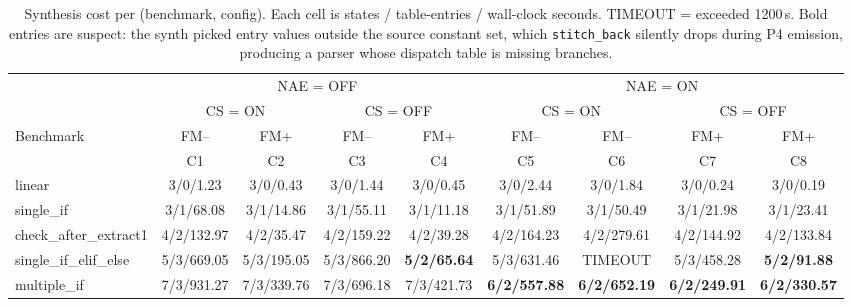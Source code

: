 
\begin{table}[h]
\centering
\small
\setlength{\tabcolsep}{4pt}
\begin{tabular}{l|cccc|cccc}
\toprule
 & \multicolumn{4}{c|}{NAE = OFF} & \multicolumn{4}{c}{NAE = ON} \\
 & \multicolumn{2}{c}{CS = ON} & \multicolumn{2}{c|}{CS = OFF}
 & \multicolumn{2}{c}{CS = ON} & \multicolumn{2}{c}{CS = OFF} \\
Benchmark
 & FM--                & FM+                 & FM--                & FM+
 & FM--                & FM--                & FM+                 & FM+ \\
 & C1                  & C2                  & C3                  & C4
 & C5                  & C6                  & C7                  & C8 \\
\midrule
linear               & 3/0/1.23   & 3/0/0.43   & 3/0/1.44   & 3/0/0.45
                     & 3/0/2.44   & 3/0/1.84   & 3/0/0.24   & 3/0/0.19   \\
single\_if            & 3/1/68.08  & 3/1/14.86  & 3/1/55.11  & 3/1/11.18
                     & 3/1/51.89  & 3/1/50.49  & 3/1/21.98  & 3/1/23.41  \\
check\_after\_extract1 & 4/2/132.97 & 4/2/35.47  & 4/2/159.22 & 4/2/39.28
                     & 4/2/164.23 & 4/2/279.61 & 4/2/144.92 & 4/2/133.84 \\
single\_if\_elif\_else & 5/3/669.05 & 5/3/195.05 & 5/3/866.20 & \textbf{5/2/65.64}
                     & 5/3/631.46 & TIMEOUT    & 5/3/458.28 & \textbf{5/2/91.88} \\
multiple\_if          & 7/3/931.27 & 7/3/339.76 & 7/3/696.18 & 7/3/421.73
                     & \textbf{6/2/557.88} & \textbf{6/2/652.19} & \textbf{6/2/249.91} & \textbf{6/2/330.57} \\
\bottomrule
\end{tabular}
\caption{Synthesis cost per (benchmark, config). Each cell is
states / table-entries / wall-clock seconds. TIMEOUT = exceeded 1200\,s.
Bold entries are suspect: the synth picked entry values outside the source
constant set, which \texttt{stitch\_back} silently drops during P4 emission,
producing a parser whose dispatch table is missing branches.}
\label{tab:exact-results}
\end{table}
